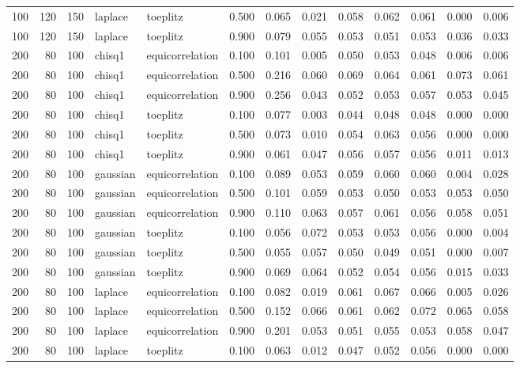\begin{tabular}{rrrllrrrrrrrr}
100 & 120 & 150 & laplace & toeplitz & 0.500 & 0.065 & 0.021 & 0.058 & 0.062 & 0.061 & 0.000 & 0.006 \\
100 & 120 & 150 & laplace & toeplitz & 0.900 & 0.079 & 0.055 & 0.053 & 0.051 & 0.053 & 0.036 & 0.033 \\
200 & 80 & 100 & chisq1 & equicorrelation & 0.100 & 0.101 & 0.005 & 0.050 & 0.053 & 0.048 & 0.006 & 0.006 \\
200 & 80 & 100 & chisq1 & equicorrelation & 0.500 & 0.216 & 0.060 & 0.069 & 0.064 & 0.061 & 0.073 & 0.061 \\
200 & 80 & 100 & chisq1 & equicorrelation & 0.900 & 0.256 & 0.043 & 0.052 & 0.053 & 0.057 & 0.053 & 0.045 \\
200 & 80 & 100 & chisq1 & toeplitz & 0.100 & 0.077 & 0.003 & 0.044 & 0.048 & 0.048 & 0.000 & 0.000 \\
200 & 80 & 100 & chisq1 & toeplitz & 0.500 & 0.073 & 0.010 & 0.054 & 0.063 & 0.056 & 0.000 & 0.000 \\
200 & 80 & 100 & chisq1 & toeplitz & 0.900 & 0.061 & 0.047 & 0.056 & 0.057 & 0.056 & 0.011 & 0.013 \\
200 & 80 & 100 & gaussian & equicorrelation & 0.100 & 0.089 & 0.053 & 0.059 & 0.060 & 0.060 & 0.004 & 0.028 \\
200 & 80 & 100 & gaussian & equicorrelation & 0.500 & 0.101 & 0.059 & 0.053 & 0.050 & 0.053 & 0.053 & 0.050 \\
200 & 80 & 100 & gaussian & equicorrelation & 0.900 & 0.110 & 0.063 & 0.057 & 0.061 & 0.056 & 0.058 & 0.051 \\
200 & 80 & 100 & gaussian & toeplitz & 0.100 & 0.056 & 0.072 & 0.053 & 0.053 & 0.056 & 0.000 & 0.004 \\
200 & 80 & 100 & gaussian & toeplitz & 0.500 & 0.055 & 0.057 & 0.050 & 0.049 & 0.051 & 0.000 & 0.007 \\
200 & 80 & 100 & gaussian & toeplitz & 0.900 & 0.069 & 0.064 & 0.052 & 0.054 & 0.056 & 0.015 & 0.033 \\
200 & 80 & 100 & laplace & equicorrelation & 0.100 & 0.082 & 0.019 & 0.061 & 0.067 & 0.066 & 0.005 & 0.026 \\
200 & 80 & 100 & laplace & equicorrelation & 0.500 & 0.152 & 0.066 & 0.061 & 0.062 & 0.072 & 0.065 & 0.058 \\
200 & 80 & 100 & laplace & equicorrelation & 0.900 & 0.201 & 0.053 & 0.051 & 0.055 & 0.053 & 0.058 & 0.047 \\
200 & 80 & 100 & laplace & toeplitz & 0.100 & 0.063 & 0.012 & 0.047 & 0.052 & 0.056 & 0.000 & 0.000 \\

\end{tabular}
